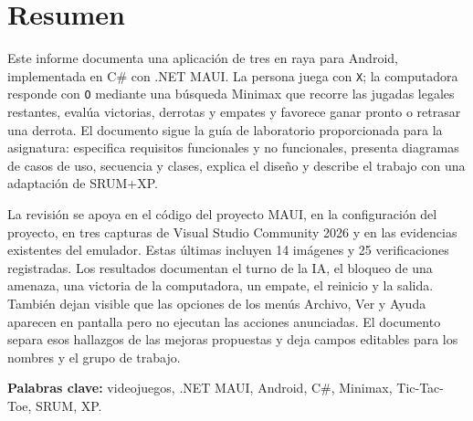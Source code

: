 \chapter*{Resumen}
Este informe documenta una aplicación de tres en raya para Android, implementada en C\# con .NET MAUI. La persona juega con \texttt{X}; la computadora responde con \texttt{O} mediante una búsqueda Minimax que recorre las jugadas legales restantes, evalúa victorias, derrotas y empates y favorece ganar pronto o retrasar una derrota. El documento sigue la guía de laboratorio proporcionada para la asignatura: especifica requisitos funcionales y no funcionales, presenta diagramas de casos de uso, secuencia y clases, explica el diseño y describe el trabajo con una adaptación de SRUM+XP.

La revisión se apoya en el código del proyecto MAUI, en la configuración del proyecto, en tres capturas de Visual Studio Community 2026 y en las evidencias existentes del emulador. Estas últimas incluyen 14 imágenes y 25 verificaciones registradas. Los resultados documentan el turno de la IA, el bloqueo de una amenaza, una victoria de la computadora, un empate, el reinicio y la salida. También dejan visible que las opciones de los menús Archivo, Ver y Ayuda aparecen en pantalla pero no ejecutan las acciones anunciadas. El documento separa esos hallazgos de las mejoras propuestas y deja campos editables para los nombres y el grupo de trabajo.

\noindent\textbf{Palabras clave:} videojuegos, .NET MAUI, Android, C\#, Minimax, Tic-Tac-Toe, SRUM, XP.

\tableofcontents
\listoffigures
\listoftables
\clearpage
{}

